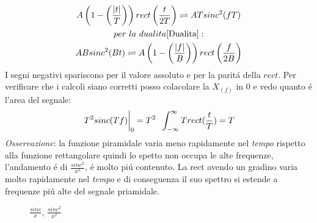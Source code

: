 {\begin{itemize}
{                    \begin{gather}
                        A\left(1-\left(\frac{|t|}{T}\right)\right)rect \left(\frac{t}{2T}\right) \rightleftharpoons ATsinc^2(fT)\nonumber\\
                        per\ la\ dualita \ref{Dualita}: \nonumber \\
                        ABsinc^2(Bt) \rightleftharpoons A\left(1-\left(\frac{|f|}{B}\right)\right)rect \left(\frac{f}{2B}\right) \nonumber
                    \end{gather} 
                    I segni negativi spariscono per il valore assoluto e per la paritá della $rect$. Per verificare che i calcoli siano
                    corretti posso colacolare la $X_{(f)}$ in $0$ e vedo quanto é l'area del segnale: 
                    \[
                        \eval{T^2sinc(Tf)}_{0} = T^2 \hspace{.2cm} \int_{-\infty}^{\infty} Trect(\frac{t}{T}) = T  
                    \]
                    {\em Osservazione}: la funzione piramidale varia meno rapidamente nel {\em tempo} rispetto alla funzione rettangolare
                    quindi lo spetto non occupa le alte frequenze, l'andamento é di $\frac{sinc^2}{x^2}$, é molto piú contenuto. La rect avendo un gradino
                    varia molto rapidamente nel {\em tempo} e di conseguenza il suo spettro si estende a frequenze piú alte del segnale priamidale.
                    \begin{figure}[H]
                        \centering
                        \caption{{\color{blue}$\frac{sinc}{x}$}, {\color{red}$\frac{sinc^2}{x^2}$}}
                        \label{fig:sinc vs sinc2}
                    \end{figure}
                }
            \end{itemize}
        }
        
